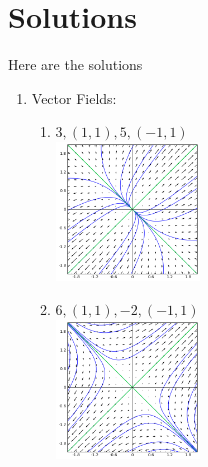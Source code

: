 {
\section{Solutions}
\small
Here are the solutions

\begin{multicols}{2}
\begin{enumerate}
\item Vector Fields:  
\newcommand{\myvfwidth}{1.5in}
\begin{enumerate}
\item $3, (1,1),  5, (-1,1)$\\ \includegraphics[width=\myvfwidth]{Applications/support/vfa}
\item $6, (1,1),  -2, (-1,1)$\\\includegraphics[width=\myvfwidth]{Applications/support/vfb}

\end{enumerate}
\end{enumerate}
\end{multicols}}
